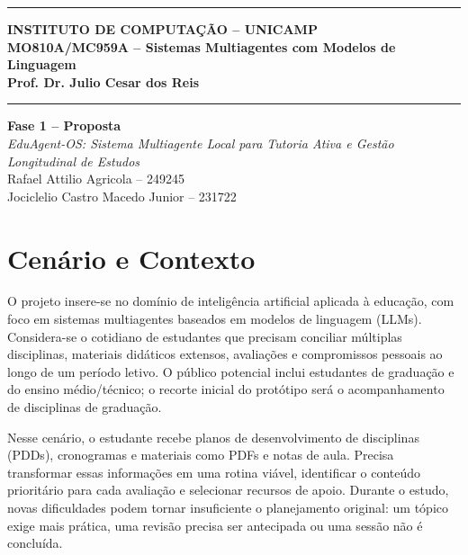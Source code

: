 \documentclass[12pt]{article}
\newcommand{\segundoautor}{Jociclelio Castro Macedo Junior}
\newcommand{\segundora}{231722}
\begin{document}
\vspace*{5mm}
\hrule
\vspace{3mm}
\begin{center}
    {\large\textbf{INSTITUTO DE COMPUTAÇÃO -- UNICAMP}} \\
    \vspace{3mm}
    {\large\textbf{MO810A/MC959A -- Sistemas Multiagentes com Modelos de Linguagem}} \\
    \vspace{3mm}
    {\large\textbf{Prof. Dr. Julio Cesar dos Reis}}
\end{center}
\vspace{3mm}
\hrule
\vspace{2.5cm}
\begin{flushright}
    {\Large\textbf{Fase 1 -- Proposta}} \\
    \vspace{1cm}
    {\Large\textit{EduAgent-OS: Sistema Multiagente Local para Tutoria Ativa e Gestão Longitudinal de Estudos}} \\
    \vspace{4cm}
    Rafael Attilio Agricola -- 249245 \\
    \segundoautor{} -- \segundora
\end{flushright}

\newpage
\fancyhf{}
\fancyfoot[R]{\thepage}

\section{Cenário e Contexto}
\label{sec:contexto}

O projeto insere-se no domínio de inteligência artificial aplicada à educação, com foco em sistemas multiagentes baseados em modelos de linguagem (LLMs). Considera-se o cotidiano de estudantes que precisam conciliar múltiplas disciplinas, materiais didáticos extensos, avaliações e compromissos pessoais ao longo de um período letivo. O público potencial inclui estudantes de graduação e do ensino médio/técnico; o recorte inicial do protótipo será o acompanhamento de disciplinas de graduação.

Nesse cenário, o estudante recebe planos de desenvolvimento de disciplinas (PDDs), cronogramas e materiais como PDFs e notas de aula. Precisa transformar essas informações em uma rotina viável, identificar o conteúdo prioritário para cada avaliação e selecionar recursos de apoio. Durante o estudo, novas dificuldades podem tornar insuficiente o planejamento original: um tópico exige mais prática, uma revisão precisa ser antecipada ou uma sessão não é concluída.
\end{document}

